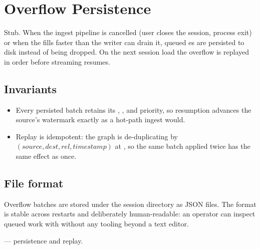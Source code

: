 \chapter{Overflow Persistence}
\label{ch:overflow}

\begin{note}
Stub. When the ingest pipeline is cancelled (user closes the
session, process exit) or when the  fills
faster than the writer can drain it, queued es
are persisted to disk instead of being dropped. On the next
session load the overflow is replayed in order before streaming
resumes.
\end{note}

\section{Invariants}

\begin{itemize}
    \item Every persisted batch retains its ,
        , and priority, so resumption advances the
        source's watermark exactly as a hot-path ingest would.
    \item Replay is idempotent: the graph is de-duplicating by
        $(source, dest, rel, timestamp)$ at
        , so the same
        batch applied twice has the same effect as once.
\end{itemize}

\section{File format}

Overflow batches are stored under the session directory as JSON
files. The format is stable across restarts and deliberately
human-readable: an operator can inspect queued work with
 without any tooling beyond a text editor.

\begin{inthecode}
 ---
persistence and replay.
\end{inthecode}
